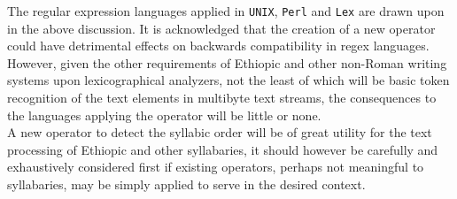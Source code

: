 The regular expression languages applied in \texttt{UNIX}, \texttt{Perl} and \texttt{Lex} are drawn upon in the above discussion. It is acknowledged that
the creation of a new operator could have detrimental effects on backwards 
compatibility in regex languages.  However, given the other requirements of 
Ethiopic and other non-Roman writing systems upon lexicographical 
analyzers, not the least of which will be basic token recognition of the text
elements in multibyte text streams, the consequences to the languages applying
the operator will be little or none.\\

A new operator to detect the syllabic order will be of great utility for the
text processing of  Ethiopic
and other syllabaries, it should however be carefully and exhaustively
considered first if existing
operators, perhaps not meaningful to syllabaries, may be simply applied
to serve in the desired context.
